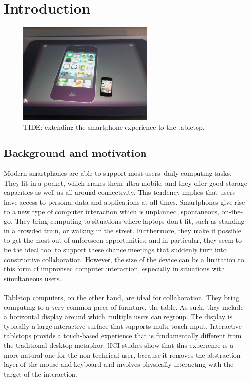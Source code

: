 

%

\chapter{Introduction}
\label{introduction}

\begin{figure}[b!]
  \centering
    \includegraphics[width=0.6\textwidth]{images/tide}
  \caption{TIDE: extending the smartphone experience to the tabletop.}
  \label{tide}
\end{figure}

\section{Background and motivation}

Modern smartphones are able to support most users' daily computing tasks.
They fit in a pocket, which makes them ultra mobile, and they offer good storage capacities as well as all-around connectivity.
This tendency implies that users have access to personal data and applications at all times.
Smartphones give rise to a new type of computer interaction which is unplanned, spontaneous, on-the-go.
They bring computing to situations where laptops don't fit, such as standing in a crowded train, or walking in the street.
Furthermore, they make it possible to get the most out of unforeseen opportunities, and in particular, they seem to be the ideal tool to support these chance meetings that suddenly turn into constructive collaboration.
However, the size of the device can be a limitation to this form of improvised computer interaction, especially in situations with simultaneous users. 
\\\\
Tabletop computers, on the other hand, are ideal for collaboration.
They bring computing to a very common piece of furniture, the table.
As such, they include a horizontal display around which multiple users can regroup.
The display is typically a large interactive surface that supports multi-touch input.	
Interactive tabletops provide a touch-based experience that is fundamentally different from the traditional desktop metaphor.
HCI studies show that this experience is a more natural one for the non-technical user, because it removes the abstraction layer of the mouse-and-keyboard and involves physically interacting with the target of the interaction.

